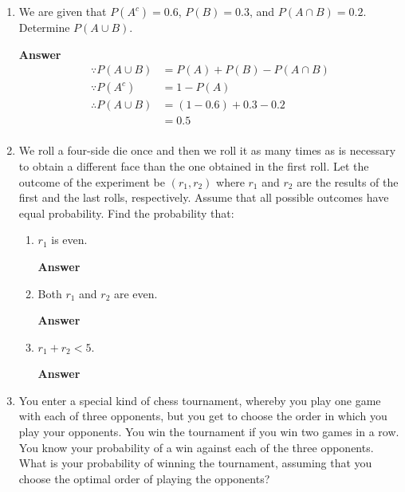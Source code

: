 \documentclass[paper=usletter, fontsize=12pt]{article}
\newcommand{\ans}{\textbf{Answer} \ }
\begin{document}
\begin{enumerate}
        \item We are given that $P(A^c) = 0.6$, $P(B) = 0.3$, and $P(A \cap B)
        = 0.2$. Determine $P(A \cup B)$.

        \ans
        \vspace{-0.4in}
        \begin{align*}
            \because P(A \cup B) & = P(A) + P(B) - P(A \cap B) \\
            \because P(A^c) & = 1 - P(A) \\
            \therefore P(A \cup B) & = (1 - 0.6) + 0.3 - 0.2 \\
            & = 0.5 \\
        \end{align*}

        \vspace{-0.4in}
        \item We roll a four-side die once and then we roll it as many times as
        is necessary to obtain a different face than the one obtained in the
        first roll. Let the outcome of the experiment be $(r_1, r_2)$ where
        $r_1$ and $r_2$ are the results of the first and the last rolls,
        respectively. Assume that all possible outcomes have equal probability.
        Find the probability that:

            \begin{enumerate}

                \item $r_1$ is even.

                \ans

                \item Both $r_1$ and $r_2$ are even.

                \ans

                \item $r_1 + r_2 < 5$.

                \ans

            \end{enumerate}

        \item You enter a special kind of chess tournament, whereby you play
        one game with each of three opponents, but you get to choose the order
        in which you play your opponents. You win the tournament if you win two
        games in a row. You know your probability of a win against each of the
        three opponents. What is your probability of winning the tournament,
        assuming that you choose the optimal order of playing the opponents?


\end{enumerate}
\end{document}
